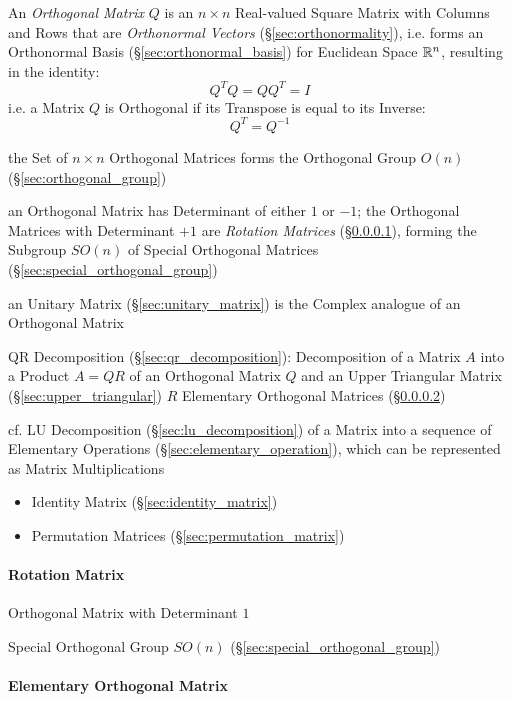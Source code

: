 An \emph{Orthogonal Matrix} $Q$ is an $n \times n $ Real-valued Square Matrix
with Columns and Rows that are \emph{Orthonormal Vectors}
(\S\ref{sec:orthonormality}), i.e. forms an Orthonormal Basis
(\S\ref{sec:orthonormal_basis}) for Euclidean Space $\mathbb{R}^n$, resulting in
the identity:
\[
  Q^TQ = QQ^T = I
\]
i.e. a Matrix $Q$ is Orthogonal if its Transpose is equal to its Inverse:
\[
  Q^T = Q^{-1}
\]

the Set of $n \times n$ Orthogonal Matrices forms the Orthogonal Group
$O(n)$ (\S\ref{sec:orthogonal_group})

an Orthogonal Matrix has Determinant of either $1$ or $-1$; the Orthogonal
Matrices with Determinant $+1$ are \emph{Rotation Matrices}
(\S\ref{sec:rotation_matrix}), forming the Subgroup $SO(n)$ of Special
Orthogonal Matrices (\S\ref{sec:special_orthogonal_group})

\fist an Unitary Matrix (\S\ref{sec:unitary_matrix}) is the Complex analogue of
an Orthogonal Matrix

QR Decomposition (\S\ref{sec:qr_decomposition}): Decomposition of a Matrix $A$
into a Product $A = QR$ of an Orthogonal Matrix $Q$ and an Upper Triangular
Matrix (\S\ref{sec:upper_triangular}) $R$ \fist Elementary Orthogonal Matrices
(\S\ref{sec:elementary_orthogonal_matrix})

cf. LU Decomposition (\S\ref{sec:lu_decomposition}) of a Matrix into a sequence
of Elementary Operations (\S\ref{sec:elementary_operation}), which can be
represented as Matrix Multiplications

\begin{itemize}
  \item Identity Matrix (\S\ref{sec:identity_matrix})
  \item Permutation Matrices (\S\ref{sec:permutation_matrix})
\end{itemize}



\paragraph{Rotation Matrix}\label{sec:rotation_matrix}\hfill

Orthogonal Matrix with Determinant $1$

Special Orthogonal Group $SO(n)$ (\S\ref{sec:special_orthogonal_group})



\paragraph{Elementary Orthogonal Matrix}
\label{sec:elementary_orthogonal_matrix}\hfill

